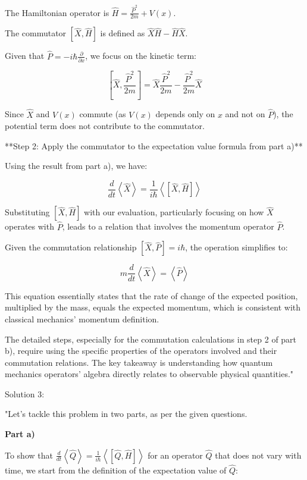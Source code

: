 The Hamiltonian operator is \( \hat{H} = \frac{\hat{P}^2}{2m} + V(x) \).

The commutator \( \left[ \hat{X}, \hat{H}\right] \) is defined as \( \hat{X}\hat{H} - \hat{H}\hat{X} \).

Given that \( \hat{P} = -i\hbar\frac{\partial}{\partial x} \), we focus on the kinetic term:

\[
\left[ \hat{X}, \frac{\hat{P}^2}{2m} \right] = \hat{X}\frac{\hat{P}^2}{2m} - \frac{\hat{P}^2}{2m}\hat{X}
\]

Since \( \hat{X} \) and \( V(x) \) commute (as \( V(x) \) depends only on \( x \) and not on \( \hat{P} \)), the potential term does not contribute to the commutator.

**Step 2: Apply the commutator to the expectation value formula from part a)**

Using the result from part a), we have:

\[
\frac{d}{dt}\left<\hat{X}\right> = \frac{1}{i\hbar}\left< \left[ \hat{X}, \hat{H} \right] \right>
\]

Substituting \( \left[ \hat{X}, \hat{H}\right] \) with our evaluation, particularly focusing on how \( \hat{X} \) operates with \( \hat{P} \), leads to a relation that involves the momentum operator \( \hat{P} \).

Given the commutation relationship \( \left[ \hat{X}, \hat{P} \right] = i\hbar \), the operation simplifies to:

\[
m\frac{d}{dt}\left<\hat{X}\right> = \left<\hat{P}\right>
\]

This equation essentially states that the rate of change of the expected position, multiplied by the mass, equals the expected momentum, which is consistent with classical mechanics' momentum definition.

The detailed steps, especially for the commutation calculations in step 2 of part b), require using the specific properties of the operators involved and their commutation relations. The key takeaway is understanding how quantum mechanics operators' algebra directly relates to observable physical quantities."

Solution 3:

"Let's tackle this problem in two parts, as per the given questions.

\textbf{Part a)}

To show that \(\frac{d}{dt}\left<\hat{Q}\right> = \frac{1}{i\hbar}\left< \left[ \hat{Q}, \hat{H} \right] \right>\) for an operator \(\hat{Q}\) that does not vary with time, we start from the definition of the expectation value of \(\hat{Q}\):

